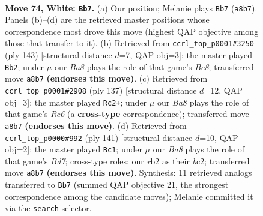 \documentclass[11pt]{article}
\begin{document}
\clearpage

\begin{figure}[p]\centering
\begin{subfigure}{0.46\textwidth}\centering
\resizebox{\linewidth}{!}{%
\newchessgame
\chessboard[
  setfen={B7/8/6k1/4p3/5p2/6p1/1r6/5K2 w - - 0 74},
  showmover=false,
  pgfstyle=straightmove, color=movearrow, markmove={a8-b7}
]}
\caption{}
\end{subfigure}\hfill
\begin{subfigure}{0.46\textwidth}\centering
\resizebox{\linewidth}{!}{%
\newchessgame
\chessboard[
  setfen={8/8/8/7P/4k1P1/7P/8/2bK4 b - - 2 72},
  showmover=false,
  pgfstyle=straightmove, color=movearrow, markmove={c1-b2}
]}
\caption{}
\end{subfigure}
\\[4pt]
\begin{subfigure}{0.46\textwidth}\centering
\resizebox{\linewidth}{!}{%
\newchessgame
\chessboard[
  setfen={8/4R3/8/5kPp/7P/2r5/7K/8 b - - 12 69},
  showmover=false,
  pgfstyle=straightmove, color=movearrow, markmove={c3-c2}
]}
\caption{}
\end{subfigure}\hfill
\begin{subfigure}{0.46\textwidth}\centering
\resizebox{\linewidth}{!}{%
\newchessgame
\chessboard[
  setfen={8/6k1/8/7P/6P1/5K2/2Bb4/8 b - - 10 71},
  showmover=false,
  pgfstyle=straightmove, color=movearrow, markmove={d2-c1}
]}
\caption{}
\end{subfigure}
\caption{\textbf{Move 74, White: \texttt{Bb7}.} (a) Our position; Melanie plays \texttt{Bb7} (\texttt{a8b7}). Panels (b)--(d) are the retrieved master positions whose correspondence most drove this move (highest QAP objective among those that transfer to it). (b) Retrieved from \texttt{ccrl\_top\_p0001\#3250} (ply 143) [structural distance $d$=7, QAP obj=3]: the master played \texttt{Bb2}; under $\mu$ our \emph{Ba8} plays the role of that game's \emph{Bc8}; transferred move \texttt{a8b7} \textbf{(endorses this move)}. (c) Retrieved from \texttt{ccrl\_top\_p0001\#2908} (ply 137) [structural distance $d$=12, QAP obj=3]: the master played \texttt{Rc2+}; under $\mu$ our \emph{Ba8} plays the role of that game's \emph{Rc6} (a \textbf{cross-type} correspondence); transferred move \texttt{a8b7} \textbf{(endorses this move)}. (d) Retrieved from \texttt{ccrl\_top\_p0000\#992} (ply 141) [structural distance $d$=10, QAP obj=2]: the master played \texttt{Bc1}; under $\mu$ our \emph{Ba8} plays the role of that game's \emph{Bd7}; cross-type roles: our \emph{r}b2 as their \emph{b}c2; transferred move \texttt{a8b7} \textbf{(endorses this move)}. Synthesis: 11 retrieved analogs transferred to \texttt{Bb7} (summed QAP objective 21, the strongest correspondence among the candidate moves); Melanie committed it via the \texttt{search} selector.}
\label{fig:thought-m146}
\end{figure}
\end{document}
